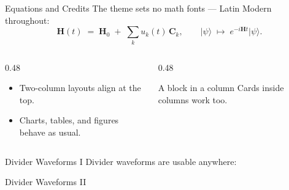 \documentclass[aspectratio=169,11pt]{beamer}
\begin{document}
\begin{frame}{Equations and Credits}
  The theme sets no math fonts --- Latin Modern throughout:
  \[
    \mathbf{H}(t) \;=\; \mathbf{H}_0 \;+\; \sum_{k} u_k(t)\,\mathbf{C}_k,
    \qquad
    \lvert\psi\rangle \;\mapsto\; e^{-i\mathbf{H}t}\lvert\psi\rangle.
  \]
  \begin{columns}[T,onlytextwidth]
    \begin{column}{0.48\textwidth}
      \begin{itemize}
        \item Two-column layouts align at the top.
        \item Charts, tables, and figures behave as usual.
      \end{itemize}
    \end{column}
    \begin{column}{0.48\textwidth}
      \begin{block}{A block in a column}
        Cards inside columns work too.
      \end{block}
    \end{column}
  \end{columns}
\end{frame}


\begin{frame}{Divider Waveforms I}
  Divider waveforms are usable anywhere:
  \par\vspace{0.5em}
  \wavegrape\par\vspace{0.6em}
  \wavechirp
\end{frame}

\begin{frame}{Divider Waveforms II}
  \par\vspace{0.2em}
  \waveramsey\par\vspace{0.5em}
  \waveecho\par\vspace{0.5em}
  \wavespectrum
\end{frame}

\end{document}
